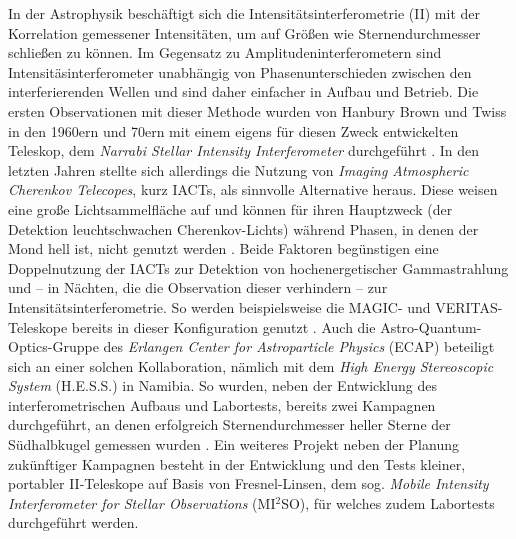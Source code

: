 In der Astrophysik beschäftigt sich die Intensitätsinterferometrie (II) mit der Korrelation gemessener Intensitäten, um auf Größen wie Sternendurchmesser schließen zu können. 
Im Gegensatz zu Amplitudeninterferometern sind Intensitäsinterferometer unabhängig von Phasenunterschieden zwischen den interferierenden Wellen und sind daher einfacher in Aufbau und Betrieb. 
Die ersten Observationen mit dieser Methode wurden von Hanbury Brown und Twiss in den 1960ern und 70ern mit einem eigens für diesen Zweck entwickelten Teleskop, dem \emph{Narrabi Stellar Intensity Interferometer} durchgeführt \cite{brownIntensityInterferometerIts1974}. 
In den letzten Jahren stellte sich allerdings die Nutzung von \emph{Imaging Atmospheric Cherenkov Telecopes}, kurz IACTs, als sinnvolle Alternative heraus. 
Diese weisen eine große Lichtsammelfläche auf und können für ihren Hauptzweck (der Detektion leuchtschwachen Cherenkov-Lichts) während Phasen, in denen der Mond hell ist, nicht genutzt werden \cite{zmijaFirstIntensityInterferometry2023}. 
Beide Faktoren begünstigen eine Doppelnutzung der IACTs zur Detektion von hochenergetischer Gammastrahlung und -- in Nächten, die die Observation dieser verhindern -- zur Intensitätsinterferometrie. 
So werden beispielsweise die MAGIC- und VERITAS-Teleskope bereits in dieser Konfiguration genutzt \cite{acciariOpticalIntensityInterferometry2020,DemonstrationStellarIntensity}. 
Auch die Astro-Quantum-Optics-Gruppe des \emph{Erlangen Center for Astroparticle Physics} (ECAP) beteiligt sich an einer solchen Kollaboration, nämlich mit dem \emph{High Energy Stereoscopic System} (H.E.S.S.) in Namibia. 
So wurden, neben der Entwicklung des interferometrischen Aufbaus und Labortests, bereits zwei Kampagnen durchgeführt, an denen erfolgreich Sternendurchmesser heller Sterne der Südhalbkugel gemessen wurden \cite{zmijaOpticalIntensityInterferometry2021,zmijaFirstIntensityInterferometry2023}. 
Ein weiteres Projekt neben der Planung zukünftiger Kampagnen besteht in der Entwicklung und den Tests kleiner, portabler II-Teleskope auf Basis von Fresnel-Linsen, dem sog. \emph{Mobile Intensity Interferometer for Stellar Observations} (MI$^2$SO), für welches zudem Labortests durchgeführt werden. \\


